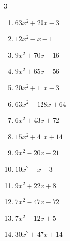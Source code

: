 \begin{multicols}{3}
\begin{enumerate}
        \phantom{$=(x+9)(x-1)$}

\columnbreak %

  \item $63x^{2}+20x-3$

        \phantom{$=(7x+3)(9x-1)$}

  \item $12x^{2}-x-1$

        \phantom{$=(3x-1)(4x+1)$}

  \item $9x^{2}+70x-16$

        \phantom{$=(9x-2)(x+8)$}

  \item $9x^{2}+65x-56$

        \phantom{$=(x+8)(9x-7)$}

  \item $20x^{2}+11x-3$

        \phantom{$=(5x-1)(4x+3)$}

  \item $63x^{2}-128x+64$

        \phantom{$=(7x-8)(9x-8)$}

  \item $6x^{2}+43x+72$

        \phantom{$=(2x+9)(3x+8)$}

  \item $15x^{2}+41x+14$

        \phantom{$=(3x+7)(5x+2)$}

  \item $9x^{2}-20x-21$

        \phantom{$=(x-3)(9x+7)$}

  \item $10x^{2}-x-3$

        \phantom{$=(2x+1)(5x-3)$}

\columnbreak %

\resetques

  \item $9x^{2}+22x+8$

        \phantom{$=(x+2)(9x+4)$}

  \item $7x^{2}-47x-72$

        \phantom{$=(7x+9)(x-8)$}

  \item $7x^{2}-12x+5$

        \phantom{$=(x-1)(7x-5)$}

  \item $30x^{2}+47x+14$


\end{enumerate}
\end{multicols}

